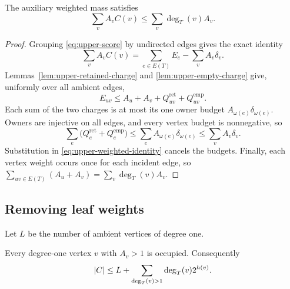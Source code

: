 \begin{proposition}\label{prop:upper-weighted}
The auxiliary weighted mass satisfies
\begin{equation}\label{eq:upper-weighted-bound}
 \sum_v A_vC(v)\leq\sum_v\deg_T(v)A_v.
\end{equation}
\end{proposition}

\begin{proof}
Grouping \eqref{eq:upper-score} by undirected edges gives the exact identity
\begin{equation}\label{eq:upper-weighted-identity}
 \sum_v A_vC(v)=\sum_{e\in E(T)}E_e-\sum_v A_v\delta_v.
\end{equation}
Lemmas~\ref{lem:upper-retained-charge} and \ref{lem:upper-empty-charge}
give, uniformly over all ambient edges,
\[
 E_{uv}\leq A_u+A_v+Q_{uv}^{\mathrm{ret}}+Q_{uv}^{\mathrm{emp}}.
\]
Each sum of the two charges is at most its one owner budget
$A_{\omega(e)}\delta_{\omega(e)}$.  Owners are injective on all edges,
and every vertex budget is nonnegative, so
\[
 \sum_e\bigl(Q_e^{\mathrm{ret}}+Q_e^{\mathrm{emp}}\bigr)
 \leq\sum_e A_{\omega(e)}\delta_{\omega(e)}
 \leq\sum_v A_v\delta_v.
\]
Substitution in \eqref{eq:upper-weighted-identity} cancels the budgets.
Finally, each vertex weight occurs once for each incident edge, so
$\sum_{uv\in E(T)}(A_u+A_v)=\sum_v\deg_T(v)A_v$.
\end{proof}

\subsection{Removing leaf weights}

Let $L$ be the number of ambient vertices of degree one.

\begin{lemma}\label{lem:upper-leaf-slack}
Every degree-one vertex $v$ with $A_v>1$ is occupied.  Consequently
\begin{equation}\label{eq:upper-compact}
 \lvert C\rvert\leq L+\sum_{\deg_T(v)>1}\deg_T(v)2^{h(v)}.
\end{equation}
\end{lemma}

